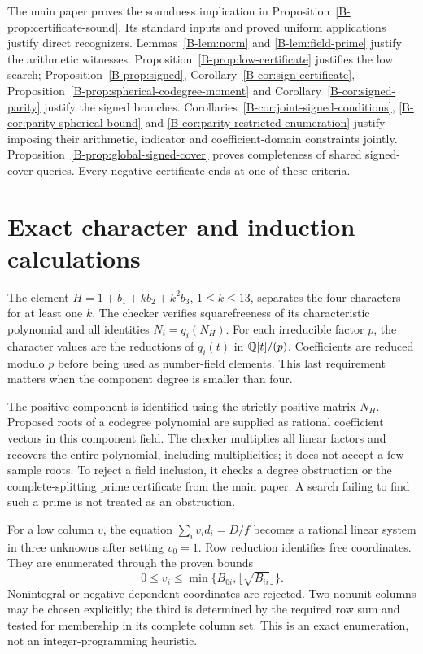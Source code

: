 \documentclass[11pt]{article}
\begin{document}
The main paper proves the soundness implication in
Proposition~\ref{B-prop:certificate-sound}. Its standard inputs and proved uniform
applications justify direct recognizers. Lemmas~\ref{B-lem:norm} and
\ref{B-lem:field-prime} justify the arithmetic witnesses.
Proposition~\ref{B-prop:low-certificate} justifies the low search;
Proposition~\ref{B-prop:signed}, Corollary~\ref{B-cor:sign-certificate},
Proposition~\ref{B-prop:spherical-codegree-moment} and
Corollary~\ref{B-cor:signed-parity} justify the signed branches.
Corollaries~\ref{B-cor:joint-signed-conditions},
\ref{B-cor:parity-spherical-bound} and
\ref{B-cor:parity-restricted-enumeration} justify imposing their arithmetic,
indicator and coefficient-domain constraints jointly.
Proposition~\ref{B-prop:global-signed-cover} proves completeness of
shared signed-cover queries. Every negative
certificate ends at one of these criteria.

\section{Exact character and induction calculations}
The element $H=1+b_1+kb_2+k^2b_3$, $1\leq k\leq13$, separates the four
characters for at least one $k$. The checker verifies squarefreeness of
its characteristic polynomial and all identities $N_i=q_i(N_H)$.
For each irreducible factor $p$, the character values are the reductions
of $q_i(t)$ in $\mathbb Q[t]/(p)$. Coefficients are reduced modulo $p$ before
being used as number-field elements. This last requirement matters when
the component degree is smaller than four.

The positive component is identified using the strictly positive matrix
$N_H$. Proposed roots of a codegree polynomial are supplied as rational
coefficient vectors in this component field. The checker multiplies all
linear factors and recovers the entire polynomial, including multiplicities;
it does not accept a few sample roots. To reject a field inclusion, it
checks a degree obstruction or the complete-splitting prime certificate
from the main paper. A search failing to find such a prime is not treated
as an obstruction.

For a low column $v$, the equation $\sum_i v_id_i=D/f$ becomes a rational
linear system in three unknowns after setting $v_0=1$. Row reduction
identifies free coordinates. They are enumerated through the proven bounds
\[
 0\leq v_i\leq\min\{B_{0i},\lfloor\sqrt{B_{ii}}\rfloor\}.
\]
Nonintegral or negative dependent coordinates are rejected. Two nonunit
columns may be chosen explicitly; the third is determined by the required
row sum and tested for membership in its complete column set. This is an
exact enumeration, not an integer-programming heuristic.
\end{document}

